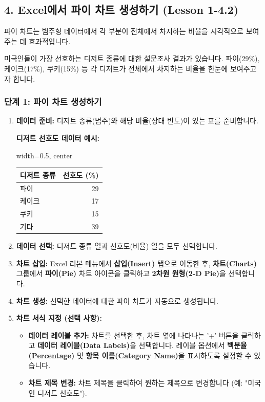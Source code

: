 \documentclass[11pt,a4paper]{article}
\theoremstyle{definition}
\begin{document}
\newpage
\subsection{4. Excel에서 파이 차트 생성하기 (Lesson 1-4.2)}

파이 차트는 범주형 데이터에서 각 부분이 전체에서 차지하는 비율을 시각적으로 보여주는 데 효과적입니다.

\begin{tcolorbox}[title=\textbf{시나리오: 미국인 디저트 선호도 분석},colback=lightblue,colframe=darkblue]
미국인들이 가장 선호하는 디저트 종류에 대한 설문조사 결과가 있습니다. 파이(29\%), 케이크(17\%), 쿠키(15\%) 등 각 디저트가 전체에서 차지하는 비율을 한눈에 보여주고자 합니다.
\end{tcolorbox}

\subsubsection*{단계 1: 파이 차트 생성하기}

\begin{enumerate}
    \item \textbf{데이터 준비:} 디저트 종류(범주)와 해당 비율(상대 빈도)이 있는 표를 준비합니다.
    \begin{examplebox}
    \textbf{디저트 선호도 데이터 예시:}
    \begin{adjustbox}{width=0.5\textwidth, center}
    \begin{tabular}{lr}
    \toprule
    \textbf{디저트 종류} & \textbf{선호도 (\%)} \\
    \midrule
    파이 & 29 \\
    케이크 & 17 \\
    쿠키 & 15 \\
    기타 & 39 \\ %
    \bottomrule
    \end{tabular}
    \end{adjustbox}
    \end{examplebox}
    \item \textbf{데이터 선택:} 디저트 종류 열과 선호도(비율) 열을 모두 선택합니다.
    \item \textbf{차트 삽입:} Excel 리본 메뉴에서 \textbf{삽입(Insert)} 탭으로 이동한 후, \textbf{차트(Charts)} 그룹에서 \textbf{파이(Pie)} 차트 아이콘을 클릭하고 \textbf{2차원 원형(2-D Pie)}을 선택합니다.
    \item \textbf{차트 생성:} 선택한 데이터에 대한 파이 차트가 자동으로 생성됩니다.
    \item \textbf{차트 서식 지정 (선택 사항):}
    \begin{itemize}
        \item \textbf{데이터 레이블 추가:} 차트를 선택한 후, 차트 옆에 나타나는 '+' 버튼을 클릭하고 \textbf{데이터 레이블(Data Labels)}을 선택합니다. 레이블 옵션에서 \textbf{백분율(Percentage)} 및 \textbf{항목 이름(Category Name)}을 표시하도록 설정할 수 있습니다.
        \item \textbf{차트 제목 변경:} 차트 제목을 클릭하여 원하는 제목으로 변경합니다 (예: "미국인 디저트 선호도").
    \end{itemize}
\end{enumerate}
\end{document}
